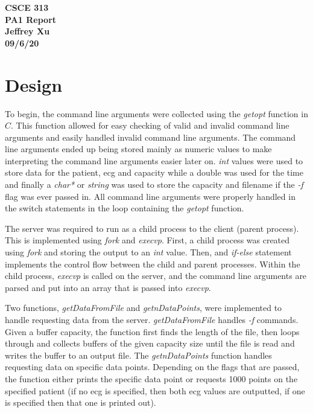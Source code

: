 \documentclass[12pt]{article}
\begin{document}
\begin{center}

{\bf
CSCE 313\\
PA1 Report\\
Jeffrey Xu\\
09/6/20\\
}

\end{center}

\section{Design}

\hspace{10mm}To begin, the command line arguments were collected using the \emph{getopt} function in $C$. This function allowed for easy checking of valid and invalid command line arguments and easily handled invalid command line arguments. The command line arguments ended up being stored mainly as numeric values to make interpreting the command line arguments easier later on. \emph{int} values were used to store data for the patient, ecg and capacity while a double was used for the time and finally a \emph{char*} or \emph{string} was used to store the capacity and filename if the \emph{-f} flag was ever passed in. All command line arguments were properly handled in the switch statements in the loop containing the \emph{getopt} function. 

The server was required to run as a child process to the client (parent process). This is implemented using \emph{fork} and \emph{execvp}. First, a child process was created using \emph{fork} and storing the output to an \emph{int} value. Then, and \emph{if-else} statement implements the control flow between the child and parent processes. Within the child process, \emph{execvp} is called on the server, and the command line arguments are parsed and put into an array that is passed into \emph{execvp}. 

Two functions, \emph{getDataFromFile} and \emph{getnDataPoints}, were implemented to handle requesting data from the server. \emph{getDataFromFile} handles \emph{-f} commands. Given a buffer capacity, the function first finds the length of the file, then loops through and collects buffers of the given capacity size until the file is read and writes the buffer to an output file. The \emph{getnDataPoints} function handles requesting data on specific data points. Depending on the flags that are passed, the function either prints the specific data point or requests 1000 points on the specified patient (if no ecg is specified, then both ecg values are outputted, if one is specified then that one is printed out). 
\end{document}
